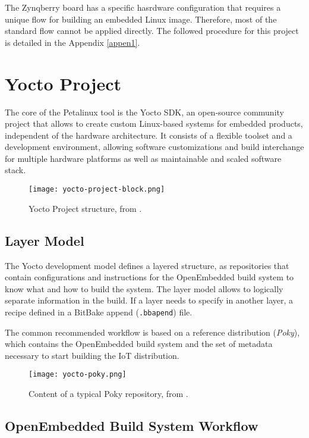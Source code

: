 The Zynqberry board has a specific hasrdware configuration that requires a unique flow for building an embedded Linux image. Therefore, most of the standard flow cannot be applied directly. The followed procedure for this project is detailed in the Appendix \ref{appen1}.

\section{Yocto Project}

The core of the Petalinux tool is the Yocto SDK, an open-source community project that allows to create custom Linux-based systems for embedded products, independent of the hardware architecture. It consists of a flexible toolset and a development environment, allowing software customizations and build interchange for multiple hardware platforms as well as maintainable and scaled software stack.

\begin{figure}[htp]
	\centering
	\texttt{[image: yocto-project-block.png]}
	\caption{Yocto Project structure, from \cite{yocto-manual}.} \label{fig:yocto-project-block}
\end{figure}

\subsection{Layer Model}

The Yocto development model defines a layered structure, as repositories that contain configurations and instructions for the OpenEmbedded build system to know what and how to build the system. The layer model allows to logically separate information in the build. If a layer needs to specify in another layer, a recipe defined in a BitBake append (\texttt{.bbapend}) file.

The common recommended workflow is based on a reference distribution (\textit{Poky}), which contains the OpenEmbedded build system and the set of metadata necessary to start building the IoT distribution.

\begin{figure}[htp]
	\centering
	\texttt{[image: yocto-poky.png]}
	\caption{Content of a typical Poky repository, from \cite{yocto-manual}.} \label{fig:yocto-poky}
\end{figure}

\subsection{OpenEmbedded Build System Workflow}

